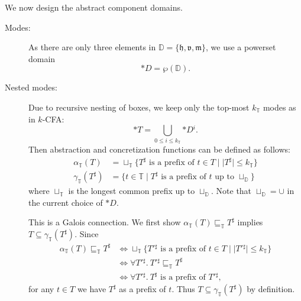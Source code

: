 \documentclass[a4paper]{article}
\newcommand*{\power}[1]{\wp(#1)}
\newcommand*{\dom}[1]{\mathbb{#1}}
\newcommand*{\mode}[1]{\mathfrak{#1}}
\newcommand*{\Abstract}[1]{\alpha_{\dom{#1}}}
\newcommand*{\Concrete}[1]{\gamma_{\dom{#1}}}
\begin{document}
We now design the abstract component domains.
\begin{description}
\item[Modes:] As there are only three elements in $\dom D = \{\mode{h}, \mode{v}, \mode{m}\}$, we use a powerset domain \[\dom*D = \power{\dom D}.\]
\item[Nested modes:] Due to recursive nesting of boxes, we keep only the top-most $k_{\dom T}$ modes as in $k$-CFA: \[\dom*T = \bigcup_{0 \le i \le k_{\dom T}} \dom*D{}^i.\]
  Then abstraction and concretization functions can be defined as follows:
  \begin{align*}
    \Abstract T(T) &= \sqcup_{\dom T}\{\text{$T^\sharp$ is a prefix of $t \in T$} \mid \lvert T^\sharp\rvert \le k_{\dom T}\} \\
    \Concrete T(T^\sharp) &= \{ t \in \dom T \mid \text{$T^\sharp$ is a prefix of $t$ up to $\sqcup_{\dom D}$}\}
  \end{align*}
  where $\sqcup_{\dom T}$ is the longest common prefix up to $\sqcup_{\dom D}$.
  Note that $\sqcup_{\dom D} = \cup$ in the current choice of $\dom*D$.

  This is a Galois connection.
  We first show $\Abstract T(T) \sqsubseteq_{\dom T} T^\sharp$ implies $T \subseteq \Concrete T(T^\sharp)$.
  Since
  \begin{align*}
    \Abstract T(T) \sqsubseteq_{\dom T} T^\sharp &\Leftrightarrow \sqcup_{\dom T}\{\text{$T'{}^\sharp$ is a prefix of $t \in T$} \mid \lvert T'{}^\sharp\rvert \le k_{\dom T}\}\\
                                  &\Leftrightarrow \forall T'{}^\sharp.\ T'{}^\sharp \sqsubseteq_{\dom T} T^\sharp\\
                                  &\Leftrightarrow \forall T'{}^\sharp.\ \text{$T^\sharp$ is a prefix of $T'{}^\sharp$,}
  \end{align*}
  for any $t \in T$ we have $T^\sharp$ as a prefix of $t$.
  Thus $T \subseteq \Concrete T(T^\sharp)$ by definition.


\end{description}
\end{document}
